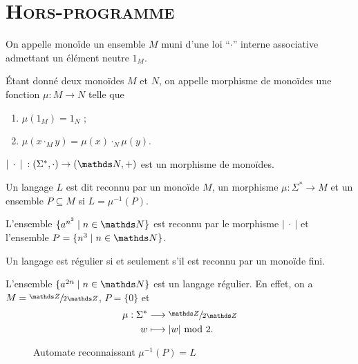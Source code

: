 \section{\scshape Hors-programme}

\begin{defn}
	On appelle monoïde un ensemble $M$\/ muni d'une loi ``$\cdot$'' interne associative admettant un élément neutre $1_M$.
\end{defn}

\begin{defn}
	Étant donné deux monoïdes $M$\/ et $N$, on appelle morphisme de monoïdes une fonction $\mu : M \to N$\/ telle que
	\begin{enumerate}
		\item $\mu(1_M) = 1_N$\/ ;
		\item $\mu(x \cdot_M y) = \mu(x) \cdot_N \mu(y)$.
	\end{enumerate}
\end{defn}

\begin{exm}
	$|\:\cdot\:|\:: (\Sigma^*, \cdot) \to (\N, +)$\/ est un morphisme de monoïdes.
\end{exm}

\begin{defn}
	Un langage $L$\/ est dit reconnu par un monoïde $M$, un morphisme $\mu : \Sigma^* \to M$\/ et un ensemble $P \subseteq M$\/ si $L = \mu^{-1}(P)$.
\end{defn}

\begin{exm}
	L'ensemble $\{a^{n^3} \mid n \in \N\}$\/ est reconnu par le morphisme $|\:\cdot\:|$\/ et l'ensemble $P = \{n^3  \mid n \in \N\}$.
\end{exm}

\begin{thm}
	Un langage est régulier si et seulement s'il est reconnu par un monoïde fini.
\end{thm}

\begin{exm}
	L'ensemble $\{a^{2n}  \mid n \in \N\}$\/ est un langage régulier. En effet, on a $M = \ZdZ$, $P = \{0\}$\/ et \begin{align*}
		\mu: \Sigma^* &\longrightarrow \ZdZ \\
		w &\longmapsto |w|\ \mathrm{mod}\ 2.
	\end{align*}

	\begin{figure}[H]
		\centering
		\caption{Automate reconnaissant $\mu^{-1}(P) = L$}
	\end{figure}
\end{exm}

